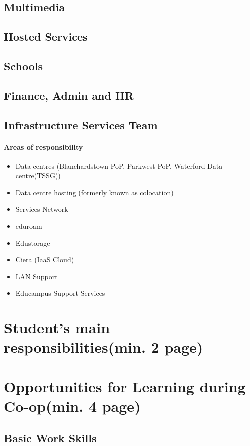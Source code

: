 \documentclass{article}
\begin{document}
	\subsection{Multimedia}
	\subsection{Hosted Services}
	\subsection{Schools}
	\subsection{Finance, Admin and HR}
	\subsection{Infrastructure Services Team}
	\paragraph{Areas of responsibility}
	\begin{itemize}
		\item Data centres (Blanchardstown PoP, Parkwest PoP, Waterford Data centre(TSSG))
		\item Data centre hosting (formerly known as colocation) 
		\item Services Network
		\item eduroam
		\item Edustorage
		\item Ciera (IaaS Cloud)
		\item LAN Support
		\item Educampus-Support-Services
	\end{itemize}
	
	
	\newpage
	
	\section{Student's main responsibilities(min. 2 page)}
	
	\newpage
	
	\section{Opportunities for Learning during Co-op(min. 4 page)}
	\subsection{Basic Work Skills}
	
\end{document}
